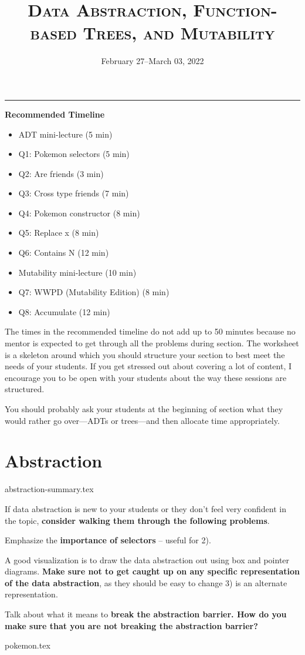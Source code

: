 \documentclass{exam}
\title{\textsc{Data Abstraction, Function-based Trees, and Mutability}}
\date{February 27--March 03, 2022}
\begin{document}
\maketitle
\rule{\textwidth}{0.15em}


\begin{meta}
\textbf{Recommended Timeline}
\begin{itemize}
    \item ADT mini-lecture (5 min)
    \item Q1: Pokemon selectors (5 min)
    \item Q2: Are friends (3 min)
    \item Q3: Cross type friends (7 min)
    \item Q4: Pokemon constructor (8 min)
    \item Q5: Replace x (8 min)
    \item Q6: Contains N (12 min)
    \item Mutability mini-lecture (10 min)
    \item Q7: WWPD (Mutability Edition) (8 min)
    \item Q8: Accumulate (12 min)
\end{itemize}
The times in the recommended timeline do not add up to 50 minutes because no mentor
is expected to get through all the problems during section. The worksheet is a skeleton
around which you should structure your section to best meet the needs of your students.
If you get stressed out about covering a lot of content, I encourage you to be open with
your students about the way these sessions are structured.  

You should probably ask your students at the beginning of section what they would rather go
over---ADTs or trees---and then allocate time appropriately. 
\end{meta}


\section{Abstraction}
{abstraction-summary.tex}
\begin{meta}
    If data abstraction is new to your students or they don't feel very confident in the topic, \textbf{consider walking them through the following problems}.
    
    Emphasize the \textbf{importance of selectors} -- useful for 2).
    
    A good visualization is to draw the data abstraction out using box and pointer diagrams. \textbf{Make sure not to get caught up on any specific representation of the data abstraction}, as they should be easy to change 3) is an alternate representation.
    
    Talk about what it means to \textbf{break the abstraction barrier. How do you make sure that you are not breaking the abstraction barrier?}
\end{meta}
\begin{questions}
    {pokemon.tex}
\end{questions}
\end{document}
